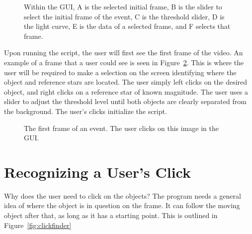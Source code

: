 \begin{figure}[htpb]
	\centering

	\caption{Within the GUI, A is the selected initial frame, B is the slider to select the initial frame of the event, C is the threshold slider, D is the light curve, E is the data of a selected frame, and F selects that frame.}
	\label{fig:gui}
\end{figure}

Upon running the script, the user will first see the first frame of the video. An example of a frame that a user could see is seen in Figure~\ref{fig:scene}. This is where the user will be required to make a selection on the screen identifying where the object and reference stars are located. The user simply left clicks on the desired object, and right clicks on a reference star of known magnitude. The user uses a slider to adjust the threshold level until both objects are clearly separated from the background. The user's clicks initialize the script. 

\begin{figure}[ht!]
	\centering
	\caption{The first frame of an event. The user clicks on this image in the GUI.}
	\label{fig:scene}
\end{figure}

\section{Recognizing a User's Click}

Why does the user need to click on the objects? The program needs a general idea of where the object is in question on the frame. It can follow the moving object after that, as long as it has a starting point. This is outlined in Figure~\ref{fig:clickfinder}

